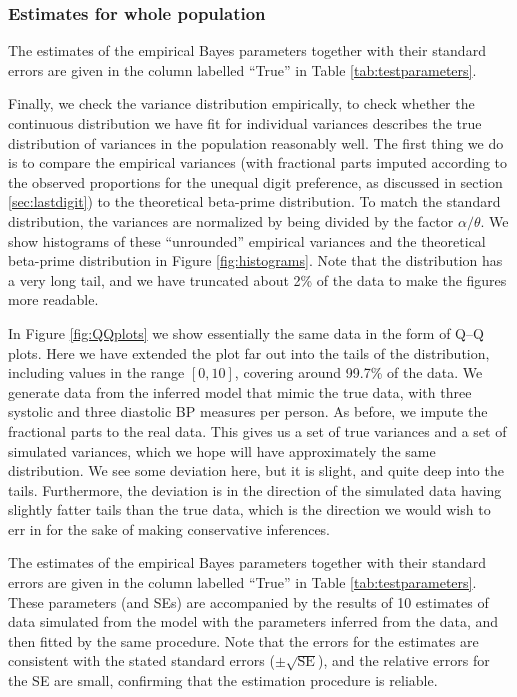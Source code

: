 \documentclass[
]{article}
\begin{document}
\subsubsection{Estimates for whole population}\label{estimates-for-whole-population}

The estimates of the empirical Bayes parameters together with their standard errors are given in the column labelled ``True'' in Table \ref{tab:testparameters}.

Finally, we check the variance distribution empirically, to check whether the continuous distribution we have fit for individual variances describes the true distribution of variances in the population reasonably well.
The first thing we do is to compare the empirical
variances (with fractional parts imputed according to the observed proportions for the unequal digit preference, as discussed in section \ref{sec:lastdigit}) to the theoretical beta-prime distribution.
To match the standard distribution, the variances are normalized by being divided by the factor \(\alpha/\theta\).
We show histograms of these ``unrounded'' empirical variances and the theoretical beta-prime distribution in Figure \ref{fig:histograms}.
Note that the distribution has a very long tail, and we have truncated about 2\% of the data to make the figures more readable.

In Figure \ref{fig:QQplots} we show essentially the same data in the form of Q--Q plots.
Here we have extended the plot far out into the tails of the distribution, including values in the range \([0,10]\), covering around 99.7\% of the data.
We generate data from the inferred model that mimic the true data, with three systolic and three diastolic BP measures per person.
As before, we impute the fractional parts to the real data.
This gives us a set of true variances and a set of simulated variances, which we hope will have approximately the same distribution.
We see some deviation here, but it is slight, and quite deep into the tails.
Furthermore, the deviation is in the direction of the simulated data having slightly fatter tails than the true data, which is the direction we would wish to err in for the sake of making conservative inferences.

The estimates of the empirical Bayes parameters together with their standard errors are given in the column labelled ``True'' in Table \ref{tab:testparameters}.
These parameters (and SEs) are accompanied by the results of 10 estimates of data simulated from the model with the parameters inferred from the data, and then fitted by the same procedure.
Note that the errors for the estimates are consistent with the stated standard errors (\(\pm \sqrt{\operatorname{SE}}\)), and the relative errors for the SE are small, confirming that the estimation procedure is reliable.
\end{document}
